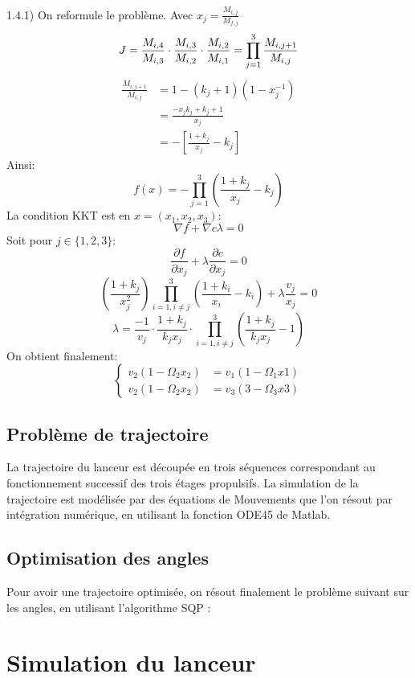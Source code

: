 \documentclass[a4paper,20pt]{article}
\begin{document}
1.4.1) On reformule le probl\`eme. Avec $x_j=\frac{M_{i,j}}{M_{f,j}}$
$$
J=\frac{M_{i,4}}{M_{i,3}}\cdot\frac{M_{i,3}}{M_{i,2}}
\cdot\frac{M_{i,2}}{M_{i,1}}=\prod\limits_{j=1}^3\frac{M_{i,j+1}}{M_{i,j}} \\
$$
\begin{equation*}
\begin{split}
\frac{M_{i,j+1}}{M_{i,j}}&=1-(k_j+1)(1-x_j^{-1}) \\
&=\frac{-x_jk_j+k_j+1}{x_j} \\
&=-\left[\frac{1+k_j}{x_j}-k_j\right]
\end{split}
\end{equation*}
Ainsi:
$$
f(x)=-\prod\limits_{j=1}^3\left(\frac{1+k_j}{x_j}-k_j\right)
$$
La condition KKT est en $x=(x_1, x_2, x_3)$:
$$
\nabla f+\nabla c\lambda=0
$$
Soit pour $j\in\{1, 2, 3\}$:
$$
\frac{\partial f}{\partial x_j}+\lambda\frac{\partial c}{\partial x_j}=0
$$
$$
\left(\frac{1+k_j}{x_j^2}\right)\prod\limits_{i=1, i\neq j}^3
\left(\frac{1+k_i}{x_i}-k_i\right)+\lambda\frac{v_j}{x_j}=0
$$
$$
\lambda=\frac{-1}{v_j}\cdot\frac{1+k_j}{k_jx_j}
\cdot\prod\limits_{i=1, i\neq j}^3\left(\frac{1+k_j}{k_jx_j}-1\right)
$$
On obtient finalement:
$$
\begin{cases}
v_2(1-\Omega_2x_2)&=v_1(1-\Omega_1x1) \\
v_2(1-\Omega_2x_2)&=v_3(3-\Omega_3x3)
\end{cases}
$$
\subsection{Probl\`eme de trajectoire}
La trajectoire du lanceur est d\'ecoup\'ee en trois s\'equences correspondant au
 fonctionnement successif des trois \'etages propulsifs. La simulation de la
 trajectoire est mod\'elis\'ee par des \'equations de Mouvements que l'on
 r\'esout par int\'egration num\'erique, en utilisant la fonction ODE45 de
 Matlab.

\subsection{Optimisation des angles}
Pour avoir une trajectoire optimis\'ee, on r\'esout finalement le probl\`eme
 suivant sur les angles, en utilisant l'algorithme SQP :

\section{Simulation du lanceur}
\end{document}
